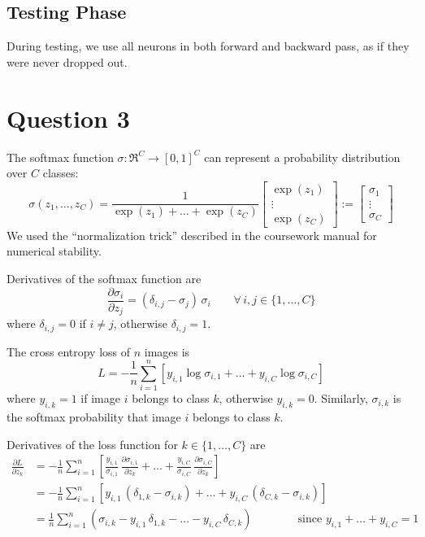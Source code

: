 \documentclass[12pt, a4paper]{article}
\begin{document}
\subsection* {Testing Phase}
During testing, we use all neurons in both forward and backward pass, as if they were never dropped out.

\section*{Question 3}

The softmax function $\sigma : \Re^C \rightarrow [0, 1]^C$ can represent a probability distribution over $C$ classes:
\[ \sigma(z_1, \dots, z_C) = \frac{1}{\exp(z_1) + \dots + \exp(z_C)}
   \begin{bmatrix} \exp(z_1) \\ \vdots \\ \exp(z_C) \end{bmatrix} :=
   \begin{bmatrix} \sigma_1  \\ \vdots \\ \sigma_C  \end{bmatrix} \]
We used the ``normalization trick'' described in the coursework manual for numerical stability.\par
\bigskip
Derivatives of the softmax function are
\[ \frac{\partial \sigma_i}{\partial z_j} = (\delta_{i,j} - \sigma_j) \, \sigma_i \qquad \forall \, i, j \in \{1, \dots, C\} \]
where $\delta_{i,j} = 0$ if $i \neq j$, otherwise $\delta_{i,j} = 1$.\par
\bigskip
The cross entropy loss of $n$ images is
\[ L = -\frac1n \sum_{i=1}^n \left[ y_{i,1} \log \sigma_{i,1} + \dots + y_{i,C} \log \sigma_{i,C} \right] \]
where $y_{i,k} = 1$ if image $i$ belongs to class $k$, otherwise $y_{i,k} = 0$. Similarly, $\sigma_{i,k}$ is the softmax probability that image $i$ belongs to class $k$.\par
\bigskip
Derivatives of the loss function for $k \in \{1, \dots, C\}$ are
\begin{align*}
    \frac{\partial L}{\partial z_k}
    &= -\frac1n \sum_{i=1}^n \left[ \frac{y_{i,1}}{\sigma_{i,1}} \, \frac{\partial \sigma_{i,1}}{\partial z_k} + \dots + \frac{y_{i,C}}{\sigma_{i,C}} \, \frac{\partial \sigma_{i,C}}{\partial z_k} \right] \\
    &= -\frac1n \sum_{i=1}^n \left[ y_{i,1} \, (\delta_{1,k} - \sigma_{i,k}) + \dots + y_{i,C} \, (\delta_{C,k} - \sigma_{i,k}) \right] \\
    &= \frac1n \sum_{i=1}^n \left( \sigma_{i,k} - y_{i,1} \, \delta_{1,k} - \dots - y_{i,C} \, \delta_{C,k} \right) \qquad \qquad \text{since } y_{i,1} + \dots + y_{i,C} = 1
\end{align*}
\end{document}

